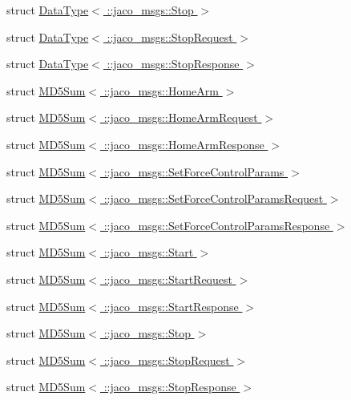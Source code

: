 \begin{DoxyCompactItemize}
struct \hyperlink{structros_1_1service__traits_1_1DataType_3_01_1_1jaco__msgs_1_1Stop_01_4}{Data\+Type$<$ \+::jaco\+\_\+msgs\+::\+Stop $>$}
\item 
struct \hyperlink{structros_1_1service__traits_1_1DataType_3_01_1_1jaco__msgs_1_1StopRequest_01_4}{Data\+Type$<$ \+::jaco\+\_\+msgs\+::\+Stop\+Request $>$}
\item 
struct \hyperlink{structros_1_1service__traits_1_1DataType_3_01_1_1jaco__msgs_1_1StopResponse_01_4}{Data\+Type$<$ \+::jaco\+\_\+msgs\+::\+Stop\+Response $>$}
\item 
struct \hyperlink{structros_1_1service__traits_1_1MD5Sum_3_01_1_1jaco__msgs_1_1HomeArm_01_4}{M\+D5\+Sum$<$ \+::jaco\+\_\+msgs\+::\+Home\+Arm $>$}
\item 
struct \hyperlink{structros_1_1service__traits_1_1MD5Sum_3_01_1_1jaco__msgs_1_1HomeArmRequest_01_4}{M\+D5\+Sum$<$ \+::jaco\+\_\+msgs\+::\+Home\+Arm\+Request $>$}
\item 
struct \hyperlink{structros_1_1service__traits_1_1MD5Sum_3_01_1_1jaco__msgs_1_1HomeArmResponse_01_4}{M\+D5\+Sum$<$ \+::jaco\+\_\+msgs\+::\+Home\+Arm\+Response $>$}
\item 
struct \hyperlink{structros_1_1service__traits_1_1MD5Sum_3_01_1_1jaco__msgs_1_1SetForceControlParams_01_4}{M\+D5\+Sum$<$ \+::jaco\+\_\+msgs\+::\+Set\+Force\+Control\+Params $>$}
\item 
struct \hyperlink{structros_1_1service__traits_1_1MD5Sum_3_01_1_1jaco__msgs_1_1SetForceControlParamsRequest_01_4}{M\+D5\+Sum$<$ \+::jaco\+\_\+msgs\+::\+Set\+Force\+Control\+Params\+Request $>$}
\item 
struct \hyperlink{structros_1_1service__traits_1_1MD5Sum_3_01_1_1jaco__msgs_1_1SetForceControlParamsResponse_01_4}{M\+D5\+Sum$<$ \+::jaco\+\_\+msgs\+::\+Set\+Force\+Control\+Params\+Response $>$}
\item 
struct \hyperlink{structros_1_1service__traits_1_1MD5Sum_3_01_1_1jaco__msgs_1_1Start_01_4}{M\+D5\+Sum$<$ \+::jaco\+\_\+msgs\+::\+Start $>$}
\item 
struct \hyperlink{structros_1_1service__traits_1_1MD5Sum_3_01_1_1jaco__msgs_1_1StartRequest_01_4}{M\+D5\+Sum$<$ \+::jaco\+\_\+msgs\+::\+Start\+Request $>$}
\item 
struct \hyperlink{structros_1_1service__traits_1_1MD5Sum_3_01_1_1jaco__msgs_1_1StartResponse_01_4}{M\+D5\+Sum$<$ \+::jaco\+\_\+msgs\+::\+Start\+Response $>$}
\item 
struct \hyperlink{structros_1_1service__traits_1_1MD5Sum_3_01_1_1jaco__msgs_1_1Stop_01_4}{M\+D5\+Sum$<$ \+::jaco\+\_\+msgs\+::\+Stop $>$}
\item 
struct \hyperlink{structros_1_1service__traits_1_1MD5Sum_3_01_1_1jaco__msgs_1_1StopRequest_01_4}{M\+D5\+Sum$<$ \+::jaco\+\_\+msgs\+::\+Stop\+Request $>$}
\item 
struct \hyperlink{structros_1_1service__traits_1_1MD5Sum_3_01_1_1jaco__msgs_1_1StopResponse_01_4}{M\+D5\+Sum$<$ \+::jaco\+\_\+msgs\+::\+Stop\+Response $>$}
\end{DoxyCompactItemize}
